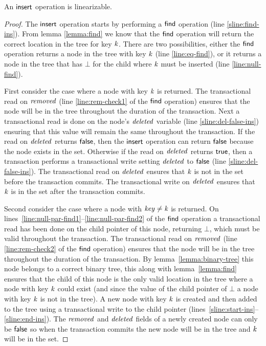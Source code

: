 \begin{theorem}
\label{theorem:insert-valid2}
An $\act{insert}$ operation is linearizable.
\end{theorem}
\begin{proof}
The $\act{insert}$ operation starts by performing a $\act{find}$ operation (line \ref{sline:find-ins}).
From lemma \ref{lemma:find} we know that the $\act{find}$ operation will return the correct location in the tree for key $\ms{k}$.
There are two possibilities, either the $\act{find}$ operation returns a node in the tree with key $\ms{k}$ (line \ref{line:eq-find}),
or it returns a node in the tree that has $\bot$ for the child where $\ms{k}$ must be inserted (line \ref{line:null-find}).

First consider the case where a node with key $\ms{k}$ is returned.
The transactional read on $\ms{removed}$ (line \ref{line:rem-check1} of the $\act{find}$ operation) ensures that the node will be in the tree throughout the duration of the transaction.
Next a transactional read is done on the node's $\ms{deleted}$ variable (line \ref{sline:del-false-ins}) ensuring that this value will remain the same throughout the transaction.
If the read on $\ms{deleted}$ returns $\lit{false}$, then the $\act{insert}$ operation can return $\lit{false}$ because the node exists in the set.
Otherwise if the read on $\ms{deleted}$ returns $\lit{true}$, then a transaction performs a transactional write setting $\ms{deleted}$ to $\lit{false}$ (line \ref{sline:del-false-ins}).
The transactional read on $\ms{deleted}$ ensures that $\ms{k}$ is not in the set before the transaction commits.
The transactional write on $\ms{deleted}$ ensures that $\ms{k}$ is in the set after the transaction commits.

Second consider the case where a node with $\ms{key} \neq \ms{k}$ is returned.
On lines~\ref{line:null-par-find1}--\ref{line:null-par-find2} of the $\act{find}$ operation a transactional read has been done on the child pointer of this node, returning $\bot$, which must be valid throughout the transaction.
The transactional read on $\ms{removed}$ (line \ref{line:rem-check2} of the $\act{find}$ operation) ensures that the node will be in the tree throughout the duration of the transaction.
By lemma~\ref{lemma:binary-tree} this node belongs to a correct binary tree, this along with
lemma~\ref{lemma:find} ensures that the child of this node is the only valid location in the tree where a node with key $\ms{k}$ could exist
(and since the value of the child pointer of $\bot$ a node with key $\ms{k}$ is not in the tree).
A new node with key $\ms{k}$ is created and then added to the tree using a transactional write to the child pointer (lines~\ref{sline:start-ins}--\ref{sline:end-ins}).
The $\ms{removed}$ and $\ms{deleted}$ fields of a newly created node can only be $\lit{false}$ so when the transaction commits the new node will be in the tree and $\ms{k}$ will be in the set.
\end{proof}


